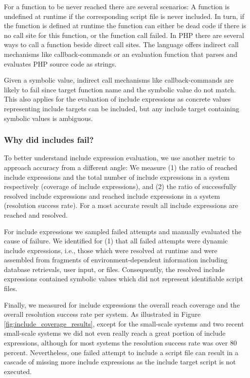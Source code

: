 \documentclass[sigconf]{acmart}
\begin{document}
For a function to be never reached there are several scenarios: A function is
undefined at runtime if the corresponding script file is never included. In
turn, if the function is defined at runtime the function can either be dead
code if there is no call site for this function, or the function call failed.
In PHP there are several ways to call a function beside direct call sites. The
language offers indirect call mechanisms like callback-commands or an
evaluation function that parses and evaluates PHP source code as strings.

Given a symbolic value, indirect call mechanisms like callback-commands are
likely to fail since target function name and the symbolic value do not match.
This also applies for the evaluation of include expressions as concrete values
representing include targets can be included, but any include target containing
symbolic values is ambiguous.

\subsubsection{Why did includes fail?}
\label{WhyDidIncludesFail}
To better understand include expression evaluation, we use another metric to
approach accuracy from a different angle: We measure (1) the ratio of reached
include expressions and the total number of include expressions in a system
respectively (coverage of include expressions), and (2) the ratio of
successfully resolved include expressions and reached include expressions in a
system (resolution success rate). For a most accurate result all include
expressions are reached and resolved.

For include expressions we sampled failed attempts and manually evaluated the
cause of failure. We identified for (1) that all failed attempts were dynamic
include expressions, i.e., those which were resolved at runtime and were
assembled from fragments of environment-dependent information including
database retrievals, user input, or files. Consequently, the resolved include
expressions contained symbolic values which did not represent identifiable
script files.

Finally, we measured for include expressions the overall reach coverage and the
overall resolution success rate per system. As illustrated in Figure
\ref{fig:include_coverage_results}, except for the small-scale systems and two
recent small-scale systems we did not even really reach a great portion of
include expressions, although for most systems the resolution success rate was
over 80 percent. Nevertheless, one failed attempt to include a script file can
result in a cascade of missing more include expressions as the include target
script is not executed.
\end{document}
